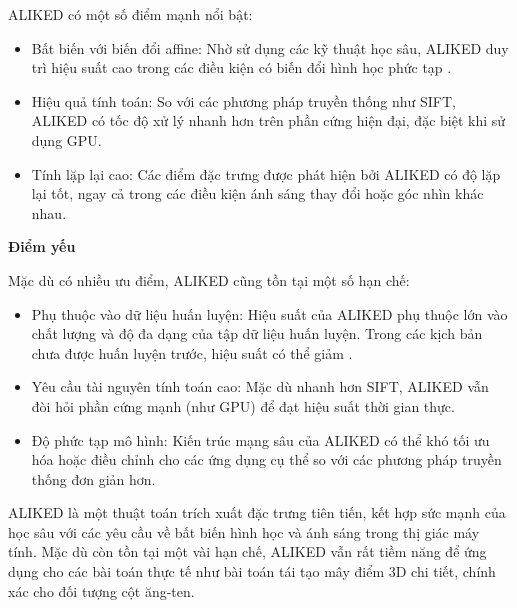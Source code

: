 ALIKED có một số điểm mạnh nổi bật:
\begin{itemize}
    \item Bất biến với biến đổi affine: Nhờ sử dụng các kỹ thuật học sâu, ALIKED duy trì hiệu suất cao trong các điều kiện có biến đổi hình học phức tạp \citep{zhao2023aliked}.
    \item Hiệu quả tính toán: So với các phương pháp truyền thống như SIFT, ALIKED có tốc độ xử lý nhanh hơn trên phần cứng hiện đại, đặc biệt khi sử dụng GPU.
    \item Tính lặp lại cao: Các điểm đặc trưng được phát hiện bởi ALIKED có độ lặp lại tốt, ngay cả trong các điều kiện ánh sáng thay đổi hoặc góc nhìn khác nhau.
\end{itemize}

\textbf{Điểm yếu}

Mặc dù có nhiều ưu điểm, ALIKED cũng tồn tại một số hạn chế:
\begin{itemize}
    \item Phụ thuộc vào dữ liệu huấn luyện: Hiệu suất của ALIKED phụ thuộc lớn vào chất lượng và độ đa dạng của tập dữ liệu huấn luyện. Trong các kịch bản chưa được huấn luyện trước, hiệu suất có thể giảm \citep{zhao2023aliked}.
    \item Yêu cầu tài nguyên tính toán cao: Mặc dù nhanh hơn SIFT, ALIKED vẫn đòi hỏi phần cứng mạnh (như GPU) để đạt hiệu suất thời gian thực.
    \item Độ phức tạp mô hình: Kiến trúc mạng sâu của ALIKED có thể khó tối ưu hóa hoặc điều chỉnh cho các ứng dụng cụ thể so với các phương pháp truyền thống đơn giản hơn.
\end{itemize}

ALIKED là một thuật toán trích xuất đặc trưng tiên tiến, kết hợp sức mạnh của học sâu với các yêu cầu về bất biến hình học và ánh sáng trong thị giác máy tính. Mặc dù còn tồn tại một vài hạn chế, ALIKED vẫn rất tiềm năng để ứng dụng cho các bài toán thực tế như bài toán tái tạo mây điểm 3D chi tiết, chính xác cho đối tượng cột ăng-ten.